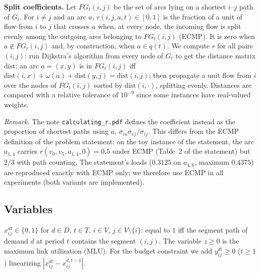 \documentclass[11pt,a4paper]{article}
\begin{document}
\textbf{Split coefficients.} Let $FG_t(i,j)$ be the set of arcs lying on a shortest $i$--$j$ path of $G_t$. For $i\neq j$ and an arc $a$, $r(i,j,a,t)\in[0,1]$ is the fraction of a unit of flow from $i$ to $j$ that crosses $a$ when, at every node, the incoming flow is split evenly among the outgoing arcs belonging to $FG_t(i,j)$ (ECMP). It is zero when $a\notin FG_t(i,j)$ and, by construction, when $a\in q(t)$. We compute $r$ for all pairs $(i,j)$: run Dijkstra's algorithm from every node of $G_t$ to get the distance matrix $\mathrm{dist}$; an arc $a=(x,y)$ is in $FG_t(i,j)$ iff $\mathrm{dist}(i,x)+\omega(a)+\mathrm{dist}(y,j)=\mathrm{dist}(i,j)$; then propagate a unit flow from $i$ over the nodes of $FG_t(i,j)$ sorted by $\mathrm{dist}(i,\cdot)$, splitting evenly. Distances are compared with a relative tolerance of $10^{-9}$ since some instances have real-valued weights.

\emph{Remark.} The note \texttt{calculating\_r.pdf} defines the coefficient instead as the proportion of shortest paths using $a$, $\sigma_{iu}\sigma_{vj}/\sigma_{ij}$. This differs from the ECMP definition of the problem statement: on the toy instance of the statement, the arc $a_{1,4}$ carries $r(v_0,v_5,a_{1,4},0)=0.5$ under ECMP (Table~2 of the statement) but $2/3$ with path counting. The statement's loads ($0.3125$ on $a_{4,6}$, maximum $0.4375$) are reproduced exactly with ECMP only; we therefore use ECMP in all experiments (both variants are implemented).

\subsection{Variables}
$x^{dt}_{ij}\in\{0,1\}$ for $d\in D$, $t\in T$, $i\in V$, $j\in V\setminus\{i\}$: equal to $1$ iff the segment path of demand $d$ at period $t$ contains the segment $(i,j)$. The variable $z\ge 0$ is the maximum link utilization (MLU). For the budget constraint we add $y^{dt}_{ij}\ge 0$ ($t\ge 1$) linearizing $|x^{dt}_{ij}-x^{d,t-1}_{ij}|$.
\end{document}
